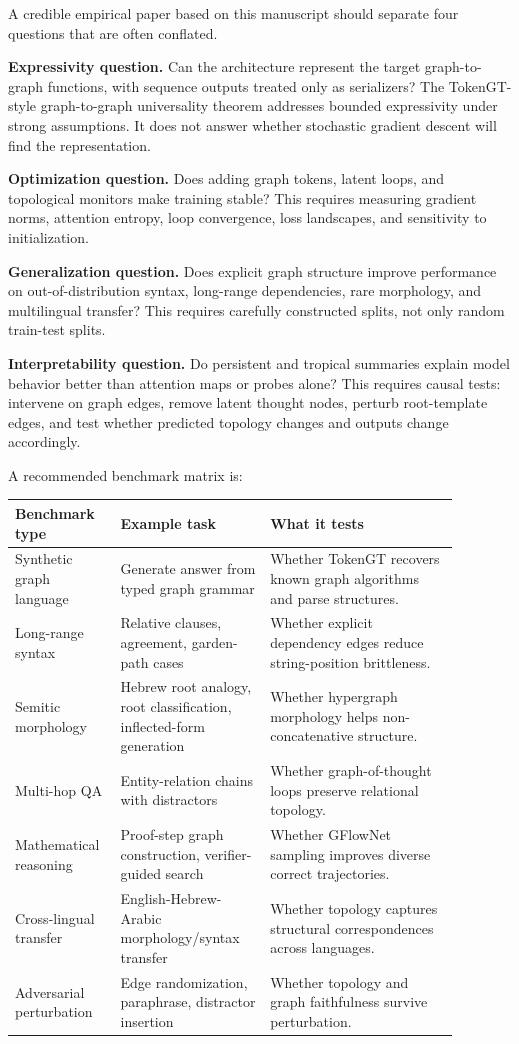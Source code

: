 \documentclass[11pt]{article}
\newcommand{\1}{\mathbf{1}}
\begin{document}
A credible empirical paper based on this manuscript should separate four questions that are often conflated.

\textbf{Expressivity question.} Can the architecture represent the target graph-to-graph functions, with sequence outputs treated only as serializers? The TokenGT-style graph-to-graph universality theorem addresses bounded expressivity under strong assumptions. It does not answer whether stochastic gradient descent will find the representation.

\textbf{Optimization question.} Does adding graph tokens, latent loops, and topological monitors make training stable? This requires measuring gradient norms, attention entropy, loop convergence, loss landscapes, and sensitivity to initialization.

\textbf{Generalization question.} Does explicit graph structure improve performance on out-of-distribution syntax, long-range dependencies, rare morphology, and multilingual transfer? This requires carefully constructed splits, not only random train-test splits.

\textbf{Interpretability question.} Do persistent and tropical summaries explain model behavior better than attention maps or probes alone? This requires causal tests: intervene on graph edges, remove latent thought nodes, perturb root-template edges, and test whether predicted topology changes and outputs change accordingly.

A recommended benchmark matrix is:

\begin{longtable}{p{0.18\linewidth}p{0.31\linewidth}p{0.39\linewidth}}
\toprule
Benchmark type & Example task & What it tests \\
\midrule
Synthetic graph language & Generate answer from typed graph grammar & Whether TokenGT recovers known graph algorithms and parse structures. \\
Long-range syntax & Relative clauses, agreement, garden-path cases & Whether explicit dependency edges reduce string-position brittleness. \\
Semitic morphology & Hebrew root analogy, root classification, inflected-form generation & Whether hypergraph morphology helps non-concatenative structure. \\
Multi-hop QA & Entity-relation chains with distractors & Whether graph-of-thought loops preserve relational topology. \\
Mathematical reasoning & Proof-step graph construction, verifier-guided search & Whether GFlowNet sampling improves diverse correct trajectories. \\
Cross-lingual transfer & English-Hebrew-Arabic morphology/syntax transfer & Whether topology captures structural correspondences across languages. \\
Adversarial perturbation & Edge randomization, paraphrase, distractor insertion & Whether topology and graph faithfulness survive perturbation. \\
\bottomrule
\end{longtable}
\end{document}
